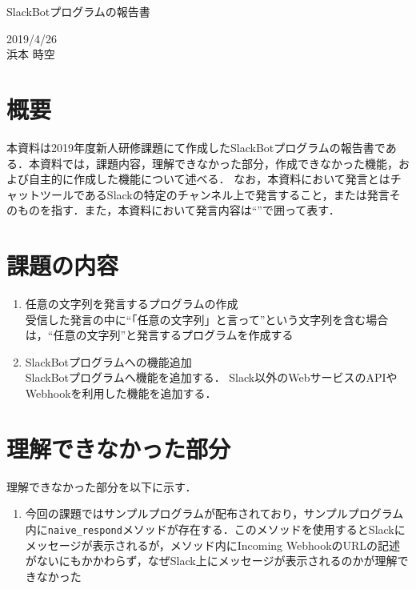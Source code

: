 \documentclass[12pt]{jsarticle}
\begin{document}
\begin{center}
{\LARGE SlackBotプログラムの報告書}
\end{center}

\begin{flushright}
  2019/4/26\\
  浜本 時空
\end{flushright}
\section{概要}
\label{sec:introduction}
本資料は2019年度新人研修課題にて作成したSlackBotプログラムの報告書である．本資料では，課題内容，理解できなかった部分，作成できなかった機能，および自主的に作成した機能について述べる．
なお，本資料において発言とはチャットツールであるSlack\cite{slack}の特定のチャンネル上で発言すること，または発言そのものを指す．また，本資料において発言内容は``''で囲って表す．

\section{課題の内容}
\begin{enumerate}
  \item 任意の文字列を発言するプログラムの作成\\
  受信した発言の中に``「任意の文字列」と言って''という文字列を含む場合は，``任意の文字列''と発言するプログラムを作成する
  \item SlackBotプログラムへの機能追加\\
  SlackBotプログラムへ機能を追加する． Slack以外のWebサービスのAPIやWebhookを利用した機能を追加する．
\end{enumerate}

\section{理解できなかった部分}
理解できなかった部分を以下に示す．
\begin{enumerate}
  \item 今回の課題ではサンプルプログラムが配布されており，サンプルプログラム内に\verb|naive_respond|メソッドが存在する．このメソッドを使用するとSlackにメッセージが表示されるが，メソッド内にIncoming WebhookのURLの記述がないにもかかわらず，なぜSlack上にメッセージが表示されるのかが理解できなかった
\end{enumerate}
\end{document}
